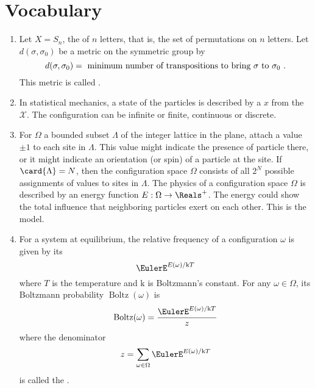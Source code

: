 \documentclass[12pt]{article}
\begin{document}
\section*{Vocabulary}
\begin{enumerate}
    \item
        Let \( X = S_n \), the  of \( n \)
        letters, that is, the set of permutations on \( n \) letters.
        Let \( d(\sigma, \sigma_0) \) be a metric on the symmetric group
        by
        \[
            d(\sigma, \sigma_0) = \text{ minimum number of
            transpositions to bring \( \sigma \) to \( \sigma_0 \) }.
        \] This metric is called .
    \item
        In statistical mechanics, a state of the particles is described
        by a  \( x \) from the  \( \mathcal{X} \).  The configuration can be infinite or
        finite, continuous or discrete.
    \item
        For \( \Omega \) a bounded subset \( \Lambda \) of the integer
        lattice in the plane, attach a value \( \pm 1 \) to each site in
        \( \Lambda \).  This value might indicate the presence of
        particle there, or it might indicate an orientation (or spin) of
        a particle at the site.  If \( \card{\Lambda} = N \), then the
        configuration space \( \Omega \) consists of all \( 2^N \)
        possible assignments of values to sites in \( \Lambda \).  The
        physics of a configuration space \( \Omega \) is described by an
        energy function \( E:  \Omega \to \Reals^+ \).  The energy could
        show the total influence that neighboring particles exert on
        each other.  This is the  model.
    \item
        For a system at equilibrium, the relative frequency of a
        configuration \( \omega \) is given by its 
        \[
            \EulerE^{E(\omega)/\mathrm{k}T}
        \] where \( T \) is the temperature and \( \mathrm{k} \) is Boltzmann's
        constant.  For any \( \omega \in \Omega \), its Boltzmann
        probability \(
        \operatorname{Boltz}
        (\omega) \) is
        \[
            \operatorname{Boltz}
            (\omega) = \frac{\EulerE^{E(\omega)/\mathrm{k}T}}{z}
        \] where the denominator
        \[
            z = \sum\limits_{\omega \in \Omega} \EulerE^{E(\omega)/\mathrm{k}T}
        \] is called the .
\end{enumerate}
\end{document}
